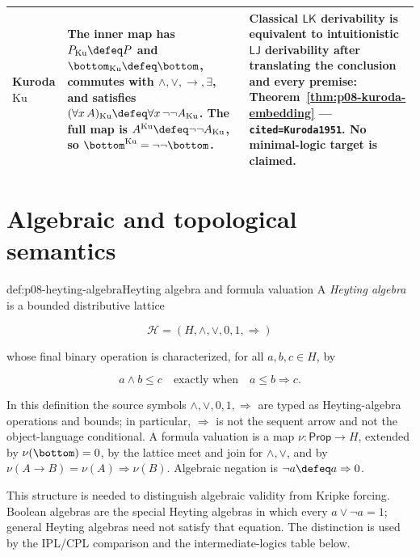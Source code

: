 \begin{landscape}
\begin{longtable}{@{}p{.75in}p{3.60in}p{2.85in}@{}}
\addlinespace
Kuroda \(\mathrm{Ku}\) &
The inner map has \(P_{\mathrm{Ku}}\defeq P\) and
\(\bottom_{\mathrm{Ku}}\defeq\bottom\), commutes with
\(\land,\lor,\to,\exists\), and satisfies
\((\forall x\,A)_{\mathrm{Ku}}\defeq
\forall x\,\neg\neg A_{\mathrm{Ku}}\).  The full map is
\(A^{\mathrm{Ku}}\defeq\neg\neg A_{\mathrm{Ku}}\), so
\(\bottom^{\mathrm{Ku}}=\neg\neg\bottom\). &
Classical \(\mathsf{LK}\) derivability is equivalent to intuitionistic
\(\mathsf{LJ}\) derivability after translating the conclusion and every
premise: Theorem~\ref{thm:p08-kuroda-embedding} ---
\texttt{cited=Kuroda1951}.  No minimal-logic target is claimed. \\
\bottomrule
\end{longtable}
\endgroup
\end{landscape}

\section{Algebraic and topological semantics}

\begin{hbdefinition}{def:p08-heyting-algebra}{Heyting algebra and formula valuation}
A \emph{Heyting algebra} is a bounded distributive lattice

\[
  \mathcal H=(H,\wedge,\vee,0,1,\Rightarrow)
\]

whose final binary operation is characterized, for all \(a,b,c\in H\), by

\[
  a\wedge b\leq c
  \quad\text{exactly when}\quad
  a\leq b\Rightarrow c.
\]

In this definition the source symbols \(\wedge,\vee,0,1,\Rightarrow\) are
typed as Heyting-algebra operations and bounds; in particular,
\(\Rightarrow\) is not the sequent arrow and not the object-language
conditional.  A formula valuation is a map
\(\nu:\mathsf{Prop}\to H\), extended by
\(\nu(\bottom)=0\), by the lattice meet and join for
\(\land,\lor\), and by
\(\nu(A\to B)=\nu(A)\Rightarrow\nu(B)\).
Algebraic negation is
\(\neg a\defeq a\Rightarrow0\).

This structure is needed to distinguish algebraic validity from Kripke
forcing.  Boolean algebras are the special Heyting algebras in which every
\(a\vee\neg a=1\); general Heyting
algebras need not satisfy that equation.  The distinction is used by the
IPL/CPL comparison and the intermediate-logics table below.
\end{hbdefinition}

